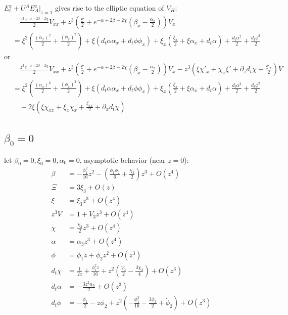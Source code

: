 \documentclass[12pt,a4paper]{article}
\numberwithin{equation}{section}
\begin{document}
$E_t^z+U^AE_A^z|_{z=1}$ gives rise to the elliptic equation of $V_H$:
\begin{equation}
    \begin{aligned}
        &\quad \frac{z^{3} e^{- \alpha+2 \beta- 2 \chi} }{2} V_{xx} + z^{3} \left(\frac{\xi'}{2} + e^{- \alpha+2 \beta- 2 \chi} \left(\beta_x - \frac{\alpha_x}{2}\right)\right) V_x\\
        & = \xi^{2} \left(\frac{\left(\alpha_x\right)^{2}}{2} + \frac{\left(\phi_x\right)^{2}}{2}\right) + \xi \left(d_{t}\alpha \alpha_x + d_{t}\phi \phi_x\right) + \xi_x \left(\frac{\xi_x}{2} + \xi \alpha_x + d_{t}\alpha\right) + \frac{d_{t}\alpha^{2}}{2} + \frac{d_{t}\phi^{2}}{2}
    \end{aligned}
\end{equation}
or
\begin{equation}
    \begin{aligned}
        &\quad \frac{z^{3} e^{- \alpha+2 \beta- 2 \chi} }{2} V_{xx} + z^{3} \left(\frac{\xi'}{2} + e^{- \alpha+2 \beta- 2 \chi} \left(\beta_x - \frac{\alpha_x}{2}\right)\right) V_x - z^{3} \left(\xi \chi'_x + \chi_x \xi' + \partial_z d_{t}\chi + \frac{\xi'_x}{2}\right) V\\
        & = \xi^{2} \left(\frac{\left(\alpha_x\right)^{2}}{2} + \frac{\left(\phi_x\right)^{2}}{2}\right) + \xi \left(d_{t}\alpha \alpha_x + d_{t}\phi \phi_x\right) + \xi_x \left(\frac{\xi_x}{2} + \xi \alpha_x + d_{t}\alpha\right) + \frac{d_{t}\alpha^{2}}{2} + \frac{d_{t}\phi^{2}}{2} \\
        &\quad - 2\xi \left(\xi \chi_{xx} + \xi_x \chi_x + \frac{\xi_{xx}}{2} + \partial_x d_t\chi\right)
    \end{aligned}
\end{equation}

\subsection{$\beta_0=0$}

let $\beta_0=0, \xi_0=0, \alpha_0=0$, asymptotic behavior (near $z=0$):
\begin{align}
    \beta&=-\frac{\phi_1^2}{16}z^2-\left(\frac{\phi_1\phi_2}{6}+\frac{\chi_3}{2}\right)z^3+O(z^4)\\
    \Xi&=3\xi_3+O(z)\\
    \xi&=\xi_3z^3+O(z^4)\\
    z^3V&=1+V_3z^3+O(z^4)\\
    \chi&=\frac{\chi_3}{2}z^3+O(z^4)\\
    \alpha&=\alpha_3z^3+O(z^4)\\
    \phi&=\phi_1z+\phi_2z^2+O(z^3)\\
    d_t\chi&=\frac{1}{2 z} + \frac{\phi_{1}^{2} z}{16} + z^{2} \left(\frac{V_{3}}{2} - \frac{3 \chi_{3}}{4}\right) + O\left(z^{3}\right)\\
    d_t\alpha&=- \frac{3 z^{2} \alpha_{3}}{2} + O\left(z^{3}\right)\\
    d_t\phi&= - \frac{\phi_{1}}{2} - z \phi_{2} + z^{2} \left(- \frac{\phi_{1}^{3}}{16} - \frac{3 \phi_{3}}{2} + \dot{\phi}_{2}\right) + O\left(z^{3}\right)
\end{align}
\end{document}
